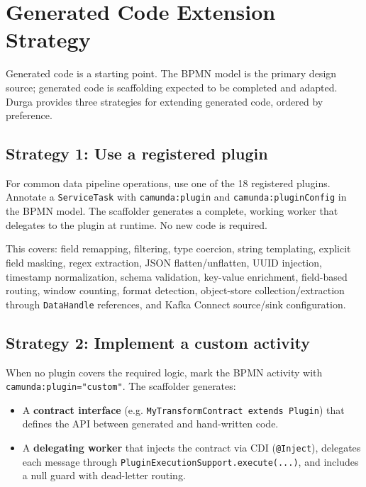 \section{Generated Code Extension Strategy}
\label{sec:ExtensionStrategy}

Generated code is a starting point. The BPMN model is the primary design source; generated
code is scaffolding expected to be completed and adapted. Durga provides three strategies
for extending generated code, ordered by preference.

\subsection{Strategy 1: Use a registered plugin}

For common data pipeline operations, use one of the 18 registered plugins. Annotate a
\texttt{ServiceTask} with \texttt{camunda:plugin} and \texttt{camunda:pluginConfig}
in the BPMN model. The scaffolder generates a complete, working worker that delegates
to the plugin at runtime. No new code is required.

This covers: field remapping, filtering, type coercion, string templating, explicit field masking,
regex extraction, JSON flatten/unflatten, UUID injection, timestamp normalization,
schema validation, key-value enrichment, field-based routing, window counting,
format detection, object-store collection/extraction through \texttt{DataHandle}
references, and Kafka Connect source/sink configuration.

\subsection{Strategy 2: Implement a custom activity}

When no plugin covers the required logic, mark the BPMN activity with
\texttt{camunda:plugin="custom"}. The scaffolder generates:

\begin{itemize}
\item A \textbf{contract interface} (e.g. \texttt{MyTransformContract extends Plugin})
  that defines the API between generated and hand-written code.
\item A \textbf{delegating worker} that injects the contract via CDI (\texttt{@Inject}),
  delegates each message through \texttt{PluginExecutionSupport.execute(...)}, and
  includes a null guard with dead-letter routing.
\end{itemize}

